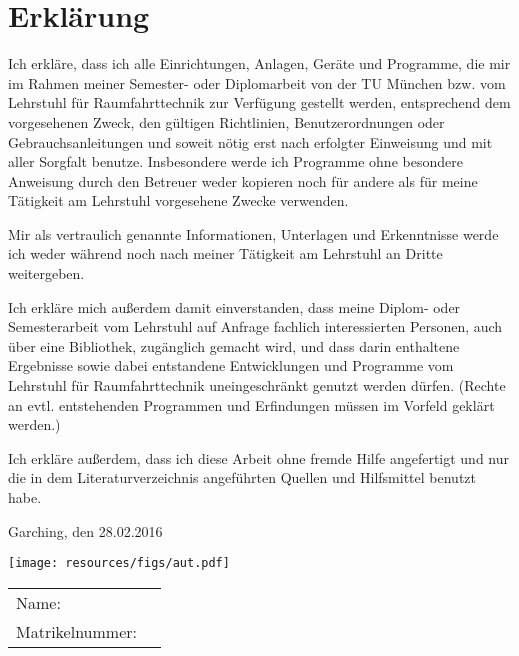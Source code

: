 \cleardoublepage
\section*{Erkl\"{a}rung}
Ich erkläre, dass ich alle Einrichtungen, Anlagen, Geräte und Programme, die mir im Rahmen meiner Semester- oder Diplomarbeit von der TU München bzw. vom Lehrstuhl für Raumfahrttechnik zur Verfügung gestellt werden, entsprechend dem vorgesehenen Zweck, den gültigen Richtlinien, Benutzerordnungen oder Gebrauchsanleitungen und soweit nötig erst nach erfolgter Einweisung und mit aller Sorgfalt benutze. Insbesondere werde ich Programme ohne besondere Anweisung durch den Betreuer weder kopieren noch für andere als für meine Tätigkeit am Lehrstuhl vorgesehene Zwecke verwenden.

Mir als vertraulich genannte Informationen, Unterlagen und Erkenntnisse werde ich weder während noch nach meiner Tätigkeit am Lehrstuhl an Dritte weitergeben.

Ich erkläre mich außerdem damit einverstanden, dass meine Diplom- oder Semesterarbeit vom Lehrstuhl auf Anfrage fachlich interessierten Personen, auch über eine Bibliothek, zugänglich gemacht wird, und dass darin enthaltene Ergebnisse sowie dabei entstandene Entwicklungen und Programme vom Lehrstuhl für Raumfahrttechnik uneingeschränkt genutzt werden dürfen. (Rechte an evtl. entstehenden Programmen und Erfindungen müssen im Vorfeld geklärt werden.)

Ich erkläre außerdem, dass ich diese Arbeit ohne fremde Hilfe angefertigt und nur die in dem Literaturverzeichnis angeführten Quellen und Hilfsmittel benutzt habe.

\vspace{24pt}

Garching, den 28.02.2016

\texttt{[image: resources/figs/aut.pdf]}

\setlength{\tabcolsep}{0pt}
\begin{table}[h!]
	\begin{tabularx}{\linewidth}{p{3.5cm} X}
		Name:			& \theauthor \\
		Matrikelnummer:	& \matrikel
	\end{tabularx}
\end{table}
\setlength{\tabcolsep}{2pt}

